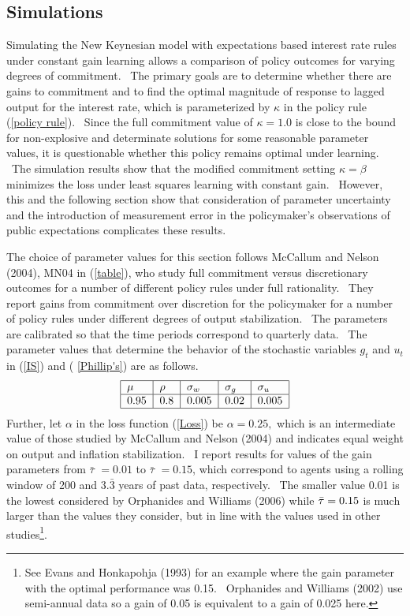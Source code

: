\documentclass{article}
\begin{document}
\begin{doublespace}
\section{Simulations}

Simulating the New Keynesian model with expectations based interest rate
rules under constant gain learning allows a comparison of policy outcomes
for varying degrees of commitment. \ The primary goals are to determine
whether there are gains to commitment and to find the optimal magnitude of
response to lagged output for the interest rate, which is parameterized by $%
\kappa $ in the policy rule (\ref{policy rule}). \ Since the full commitment
value of $\kappa =1.0$ is close to the bound for non-explosive and
determinate solutions for some reasonable parameter values, it is
questionable whether this policy remains optimal under learning. \ The
simulation results show that the modified commitment setting $\kappa =\beta $
minimizes the loss under least squares learning with constant gain. \
However, this and the following section show that consideration of parameter
uncertainty and the introduction of measurement error in the policymaker's
observations of public expectations complicates these results.

The choice of parameter values for this section follows McCallum and Nelson
(2004), MN04 in (\ref{table}), who study full commitment versus
discretionary outcomes for a number of different policy rules under full
rationality. \ They report gains from commitment over discretion for the
policymaker for a number of policy rules under different degrees of output
stabilization. \ The parameters are calibrated so that the time periods
correspond to quarterly data. \ The parameter values that determine the
behavior of the stochastic variables $g_{t}$ and $u_{t}$ in (\ref{IS}) and (%
\ref{Phillip's}) are as follows.%
\begin{equation*}
\begin{tabular}{|l|l|l|l|l|}
\hline
$\mu $ & $\rho $ & $\sigma _{w}$ & $\sigma _{g}$ & $\sigma _{u}$ \\ \hline
$0.95$ & $0.8$ & $0.005$ & $0.02$ & $0.005$ \\ \hline
\end{tabular}%
\end{equation*}%
Further, let $\alpha $ in the loss function (\ref{Loss}) be $\alpha =0.25,$
which is an intermediate value of those studied by McCallum and Nelson
(2004) and indicates equal weight on output and inflation stabilization. \ I
report results for values of the gain parameters from $\bar{\tau}$ $=0.01$
to $\bar{\tau}$ $=0.15$, which correspond to agents using a rolling window
of 200 and $3.\bar{3}$ years of past data, respectively. \ The smaller value
0.01 is the lowest considered by Orphanides and Williams (2006) while $\bar{%
\tau}=0.15$ is much larger than the values they consider, but in line with
the values used in other studies\footnote{%
See Evans and Honkapohja (1993) for an example where the gain parameter with
the optimal performance was 0.15. \ Orphanides and Williams (2002) use
semi-annual data so a gain of 0.05 is equivalent to a gain of 0.025 here.}.


\end{doublespace}
\end{document}

